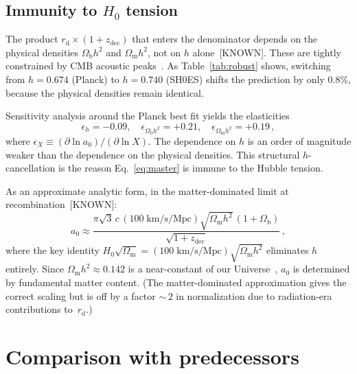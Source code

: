 \documentclass[prl,twocolumn,superscriptaddress,longbibliography]{revtex4-2}
\newcommand{\zdec}{z_{\mathrm{dec}}}
\newcommand{\rd}{r_{\mathrm{d}}}
\newcommand{\Ob}{\Omega_{\mathrm{b}}}
\newcommand{\Om}{\Omega_{\mathrm{m}}}
\newcommand{\azero}{a_0}
\begin{document}
\subsection{Immunity to $H_0$ tension}
\label{sec:h0}

The product
$\rd \times (1+\zdec)$ that enters the denominator
depends on the physical densities $\Ob h^2$ and
$\Om h^2$, not on $h$ alone~[KNOWN].
These are tightly constrained by CMB acoustic
peaks~\cite{Planck2018}.
As Table~\ref{tab:robust} shows, switching from
$h = 0.674$ (Planck) to $h = 0.740$ (SH0ES) shifts
the prediction by only $0.8\%$, because the physical
densities remain identical.

Sensitivity analysis around the Planck best fit yields
the elasticities
\begin{equation}
  \epsilon_h = -0.09, \quad
  \epsilon_{\Ob h^2} = +0.21, \quad
  \epsilon_{\Om h^2} = +0.19 \,,
  \label{eq:elasticity}
\end{equation}
where $\epsilon_X \equiv (\partial \ln \azero)/
(\partial \ln X)$.
The dependence on $h$ is an order of magnitude
weaker than the dependence on the physical
densities.
This structural $h$-cancellation is the reason
Eq.~\eqref{eq:master} is immune to the Hubble
tension.

As an approximate analytic form, in the
matter-dominated limit at recombination~[KNOWN]:
\begin{equation}
  \azero \approx
  \frac{\pi\sqrt{3}\,c\,(100\;\mathrm{km/s/Mpc})
    \sqrt{\Om h^2}\,(1+\Ob)}{\sqrt{1+\zdec}} \,,
  \label{eq:analytic}
\end{equation}
where the key identity
$H_0\sqrt{\Om} = (100\;\mathrm{km/s/Mpc})\sqrt{\Om h^2}$
eliminates $h$ entirely.
Since $\Om h^2 \approx 0.142$ is a near-constant of
our Universe~\cite{Planck2018}, $\azero$ is determined
by fundamental matter content.
(The matter-dominated approximation gives the correct
scaling but is off by a factor ${\sim}\,2$ in
normalization due to radiation-era contributions
to~$\rd$.)


\section{Comparison with predecessors}
\label{sec:comparison}
\end{document}
